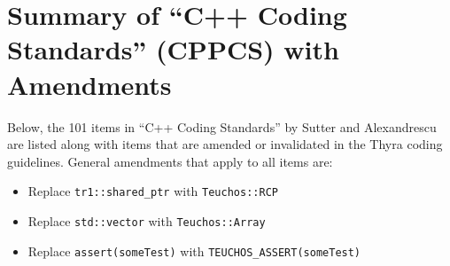 %
\section{Summary of ``C++ Coding Standards'' (CPPCS) with Amendments}
\label{sec:cpp_coding_standards}
%

Below, the 101 items in ``C++ Coding Standards'' by Sutter and Alexandrescu
{}\cite{C++CodingStandards05} are listed along with items that are amended or
invalidated in the Thyra coding guidelines.  General amendments that apply to
all items are:

\begin{itemize}

{}\item Replace {}\texttt{tr1::shared\_ptr} with {}\texttt{Teuchos::RCP}

{}\item Replace {}\texttt{std::vector} with {}\texttt{Teuchos::Array}

{}\item Replace {}\texttt{assert(someTest)} with {}\texttt{TEUCHOS\_ASSERT(someTest)}

\end{itemize}

